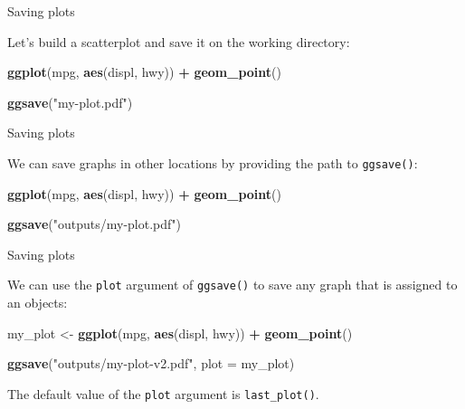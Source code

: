 \documentclass[ignorenonframetext,]{beamer}
\newenvironment{Shaded}{\begin{snugshade}}{\end{snugshade}}
\newcommand{\DataTypeTok}[1]{\textcolor[rgb]{0.13,0.29,0.53}{#1}}
\newcommand{\KeywordTok}[1]{\textcolor[rgb]{0.13,0.29,0.53}{\textbf{#1}}}
\newcommand{\NormalTok}[1]{#1}
\newcommand{\OperatorTok}[1]{\textcolor[rgb]{0.81,0.36,0.00}{\textbf{#1}}}
\newcommand{\StringTok}[1]{\textcolor[rgb]{0.31,0.60,0.02}{#1}}
\begin{document}
\begin{frame}[fragile]{Saving plots}
\protect\hypertarget{saving-plots}{}

Let's build a scatterplot and save it on the working directory:

\begin{Shaded}
\begin{Highlighting}[]
\KeywordTok{ggplot}\NormalTok{(mpg, }\KeywordTok{aes}\NormalTok{(displ, hwy)) }\OperatorTok{+}
\StringTok{  }\KeywordTok{geom_point}\NormalTok{()}

\KeywordTok{ggsave}\NormalTok{(}\StringTok{"my-plot.pdf"}\NormalTok{)}
\end{Highlighting}
\end{Shaded}

\end{frame}

\begin{frame}[fragile]{Saving plots}
\protect\hypertarget{saving-plots-1}{}

We can save graphs in other locations by providing the path to
\texttt{ggsave()}:

\begin{Shaded}
\begin{Highlighting}[]
\KeywordTok{ggplot}\NormalTok{(mpg, }\KeywordTok{aes}\NormalTok{(displ, hwy)) }\OperatorTok{+}
\StringTok{  }\KeywordTok{geom_point}\NormalTok{()}

\KeywordTok{ggsave}\NormalTok{(}\StringTok{"outputs/my-plot.pdf"}\NormalTok{)}
\end{Highlighting}
\end{Shaded}

\end{frame}

\begin{frame}[fragile]{Saving plots}
\protect\hypertarget{saving-plots-2}{}

We can use the \texttt{plot} argument of \texttt{ggsave()} to save any
graph that is assigned to an objects:

\begin{Shaded}
\begin{Highlighting}[]
\NormalTok{my_plot <-}\StringTok{ }\KeywordTok{ggplot}\NormalTok{(mpg, }\KeywordTok{aes}\NormalTok{(displ, hwy)) }\OperatorTok{+}
\StringTok{  }\KeywordTok{geom_point}\NormalTok{()}

\KeywordTok{ggsave}\NormalTok{(}\StringTok{"outputs/my-plot-v2.pdf"}\NormalTok{, }\DataTypeTok{plot =}\NormalTok{ my_plot)}
\end{Highlighting}
\end{Shaded}

The default value of the \texttt{plot} argument is
\texttt{last\_plot()}.

\end{frame}
\end{document}
